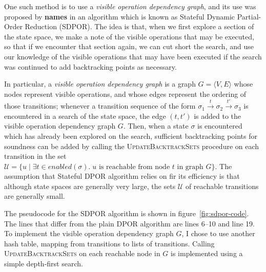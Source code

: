 \documentclass[12pt,a4paper,twoside,openright]{report}
\begin{document}
One such method is to use a \emph{visible operation dependency
graph}, and its use was proposed by \textbf{names} in an
algorithm which is known as Stateful Dynamic Partial-
Order Reduction (SDPOR). The idea is that, when we first explore
a section of the state space,
we make a note of the visible operations
that may be executed, so that if we encounter that section again,
we can cut short the search, and use our knowledge of the
visible operations that may have been
executed if the search was continued
to add backtracking points as necessary.

In particular, a \emph{visible operation dependency
graph} is a graph $G = \langle V, E \rangle$ whose
nodes represent visible operations, and whose edges
represent the ordering of those transitions; whenever
a transition sequence of the form
$\sigma_1 \xrightarrow{t} \sigma_2 \xrightarrow{t'}
 \sigma_3$
is encountered in a search of the state space, the
edge $(t, t')$ is added to the visible operation
dependency graph $G$. Then, when a state $\sigma$ is
encountered which has already been explored on the
search, sufficient backtracking points for soundness
can be added by calling the
\textsc{UpdateBacktrackSets} procedure
on each transition in the set
$\mathcal{U} = \{u \mid \exists t \in \textit{enabled}(\sigma).\;
   u \text{ is reachable from node } t \text{ in graph } G\}$.
The assumption that Stateful DPOR algorithm 
relies on fir its efficiency is that
although state spaces are generally very large,
the sets $\mathcal{U}$ of reachable transitions
are generally small.

The pseudocode for the SDPOR algorithm is shown
in figure~\ref{fig:sdpor-code}. The lines that
differ from the plain DPOR algorithm are lines
6--10 and line 19.
To implement the visible operation dependency graph
$G$, I chose to use another hash table,
mapping from transitions to lists of transitions.
Calling \textsc{UpdateBacktrackSets} on
each reachable node in $G$ is implemented using
a simple depth-first search.
\end{document}

